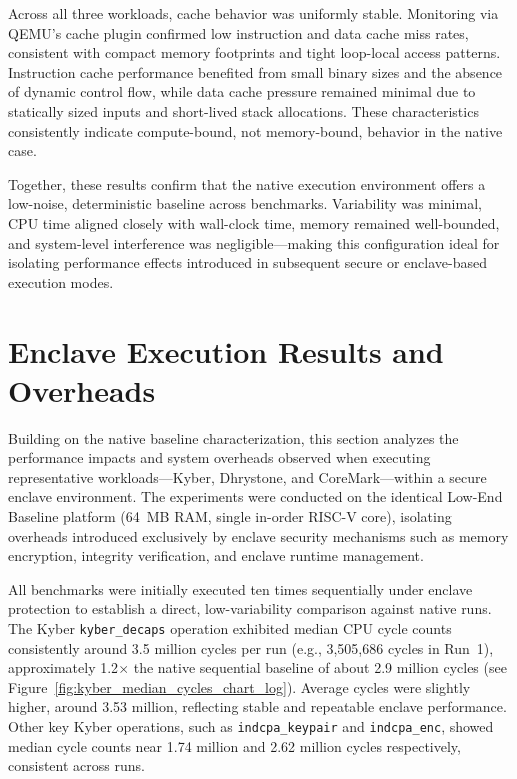 Across all three workloads, cache behavior was uniformly stable. Monitoring via QEMU’s cache plugin confirmed low instruction and data cache miss rates, consistent with compact memory footprints and tight loop-local access patterns. Instruction cache performance benefited from small binary sizes and the absence of dynamic control flow, while data cache pressure remained minimal due to statically sized inputs and short-lived stack allocations. These characteristics consistently indicate compute-bound, not memory-bound, behavior in the native case.

Together, these results confirm that the native execution environment offers a low-noise, deterministic baseline across benchmarks. Variability was minimal, CPU time aligned closely with wall-clock time, memory remained well-bounded, and system-level interference was negligible—making this configuration ideal for isolating performance effects introduced in subsequent secure or enclave-based execution modes.

\section{Enclave Execution Results and Overheads}
\label{sec:enclave-execution}

Building on the native baseline characterization, this section analyzes the performance impacts and system overheads observed when executing representative workloads—Kyber, Dhrystone, and CoreMark—within a secure enclave environment. The experiments were conducted on the identical Low-End Baseline platform (64~MB RAM, single in-order RISC-V core), isolating overheads introduced exclusively by enclave security mechanisms such as memory encryption, integrity verification, and enclave runtime management.

All benchmarks were initially executed ten times sequentially under enclave protection to establish a direct, low-variability comparison against native runs. The Kyber \texttt{kyber\_decaps} operation exhibited median CPU cycle counts consistently around 3.5 million cycles per run (e.g., 3,505,686 cycles in Run~1), approximately 1.2$\times$ the native sequential baseline of about 2.9 million cycles (see Figure~\ref{fig:kyber_median_cycles_chart_log}). Average cycles were slightly higher, around 3.53 million, reflecting stable and repeatable enclave performance. Other key Kyber operations, such as \texttt{indcpa\_keypair} and \texttt{indcpa\_enc}, showed median cycle counts near 1.74 million and 2.62 million cycles respectively, consistent across runs.

